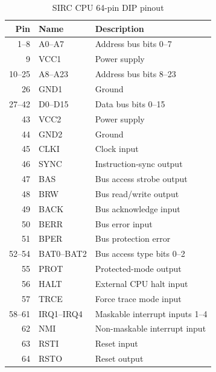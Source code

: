 \begin{table}[H]
	\centering
	\begin{tabular}{rll}
		\toprule
		\textbf{Pin} & \textbf{Name} & \textbf{Description}           \\
		\midrule
		1--8         & A0--A7        & Address bus bits 0--7          \\
		9            & VCC1          & Power supply                   \\
		10--25       & A8--A23       & Address bus bits 8--23         \\
		26           & GND1          & Ground                         \\
		27--42       & D0--D15       & Data bus bits 0--15            \\
		43           & VCC2          & Power supply                   \\
		44           & GND2          & Ground                         \\
		45           & CLKI          & Clock input                    \\
		46           & SYNC          & Instruction-sync output        \\
		47           & BAS           & Bus access strobe output       \\
		48           & BRW           & Bus read/write output          \\
		49           & BACK          & Bus acknowledge input          \\
		50           & BERR          & Bus error input                \\
		51           & BPER          & Bus protection error           \\
		52--54       & BAT0--BAT2    & Bus access type bits 0--2      \\
		55           & PROT          & Protected-mode output          \\
		56           & HALT          & External CPU halt input        \\
		57           & TRCE          & Force trace mode input         \\
		58--61       & IRQ1--IRQ4    & Maskable interrupt inputs 1--4 \\
		62           & NMI           & Non-maskable interrupt input   \\
		63           & RSTI          & Reset input                    \\
		64           & RSTO          & Reset output                   \\
		\bottomrule
	\end{tabular}
	\caption{SIRC CPU 64-pin DIP pinout}
\end{table}

